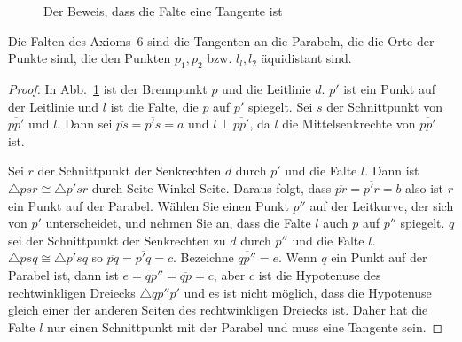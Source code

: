 \begin{figure}[thb]
\begin{center}
\end{center}
\caption{Der Beweis, dass die Falte eine Tangente ist}\label{f.tangent-proof}
\end{figure}

\begin{theorem}\label{thm.parabola-tangents}
Die Falten des Axioms~$6$ sind die Tangenten an die Parabeln, die die Orte der Punkte sind, die den Punkten $p_1,p_2$ bzw. $l_l,l_2$ äquidistant sind.
\end{theorem}
\begin{proof}
In Abb.~\ref{f.tangent-proof} ist der Brennpunkt $p$ und die Leitlinie $d$. $p'$ ist ein Punkt auf der Leitlinie und $l$ ist die Falte, die $p$ auf $p'$ spiegelt. Sei $s$ der Schnittpunkt von $\overline{pp'}$ und $l$. Dann sei $\overline{ps}=\overline{p's}=a$ und $l\perp \overline{pp'}$, da $l$ die Mittelsenkrechte von $\overline{pp'}$ ist.

Sei $r$ der Schnittpunkt der Senkrechten $d$ durch $p'$ und die Falte $l$. Dann ist $\triangle psr\cong \triangle p'sr$ durch Seite-Winkel-Seite. Daraus folgt, dass 
$\overline{pr}=\overline{p'r}=b$ also ist $r$ ein Punkt auf der Parabel. Wählen Sie einen Punkt $p''$ auf der Leitkurve, der sich von $p'$ unterscheidet, und nehmen Sie an, dass die Falte $l$ auch $p$ auf $p''$ spiegelt. $q$ sei der Schnittpunkt der Senkrechten zu $d$ durch $p''$ und die Falte $l$. $\triangle psq\cong \triangle p'sq$ so $\overline{pq}=\overline{p'q}=c$. Bezeichne $\overline{qp''}=e$. Wenn $q$ ein Punkt auf der Parabel ist, dann ist $e=\overline{qp''}=\overline{qp}=c$, aber $c$ ist die Hypotenuse des rechtwinkligen Dreiecks $\triangle qp''p'$ und es ist nicht möglich, dass die Hypotenuse gleich einer der anderen Seiten des rechtwinkligen Dreiecks ist. Daher hat die Falte $l$ nur einen Schnittpunkt mit der Parabel und muss eine Tangente sein.
\end{proof}

